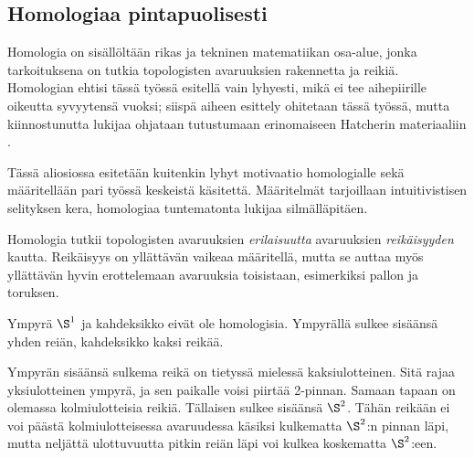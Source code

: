 \subsection{Homologiaa pintapuolisesti}
Homologia on sisällöltään rikas ja tekninen matematiikan osa-alue, jonka tarkoituksena on tutkia topologisten avaruuksien rakennetta ja reikiä. Homologian ehtisi tässä työssä esitellä vain lyhyesti, mikä ei tee aihepiirille oikeutta syvyytensä vuoksi; siispä aiheen esittely ohitetaan tässä työssä, mutta kiinnostunutta lukijaa ohjataan tutustumaan erinomaiseen Hatcherin materiaaliin \citep{Hatcher2002}.

Tässä aliosiossa esitetään kuitenkin lyhyt motivaatio homologialle sekä määritellään pari työssä keskeistä käsitettä. Määritelmät tarjoillaan intuitivistisen selityksen kera, homologiaa tuntematonta lukijaa silmälläpitäen.
\begin{ajatus}
    Homologia tutkii topologisten avaruuksien \emph{erilaisuutta} avaruuksien \emph{reikäisyyden} kautta. Reikäisyys on yllättävän vaikeaa määritellä, mutta se auttaa myös yllättävän hyvin erottelemaan avaruuksia toisistaan, esimerkiksi pallon ja toruksen.
\end{ajatus}
\begin{esimerkki}
    Ympyrä $\S^1$ ja kahdeksikko eivät ole homologisia. Ympyrällä sulkee sisäänsä yhden reiän, kahdeksikko kaksi reikää.
\end{esimerkki}
Ympyrän sisäänsä sulkema reikä on tietyssä mielessä kaksiulotteinen. Sitä rajaa yksiulotteinen ympyrä, ja sen paikalle voisi piirtää 2-pinnan. Samaan tapaan on olemassa kolmiulotteisia reikiä. Tällaisen sulkee sisäänsä $\S^2$. Tähän reikään ei voi päästä kolmiulotteisessa avaruudessa käsiksi kulkematta $\S^2$:n pinnan läpi, mutta neljättä ulottuvuutta pitkin reiän läpi voi kulkea koskematta $\S^2$:een.

